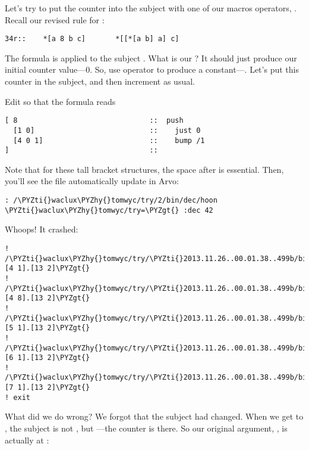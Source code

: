 Let's try to put the counter into the subject with one of our
macros operators, .  Recall our revised rule for :

\begin{framed_shaded}
\begin{Verbatim}[fontsize=\relsize{-2.5},fontseries=b,commandchars=\\\{\}]
34r::    *[a 8 b c]       *[[*[a b] a] c]
\end{Verbatim}
\end{framed_shaded}
The formula  is applied to the subject \kode{[*[a b] a]}.  What is
our ?  It should just produce our initial counter value---0.
So, use operator  to produce a constant---\kode{[1 0]}.  Let's
put this counter in the subject, and then increment as usual.

Edit  so that the formula reads

\begin{framed_shaded}
\begin{Verbatim}[fontsize=\relsize{-2.5},fontseries=b,commandchars=\\\{\}]
[ 8                               ::  push
  [1 0]                           ::    just 0
  [4 0 1]                         ::    bump /1
]                                 ::
\end{Verbatim}
\end{framed_shaded}
Note that for these tall bracket structures, the space after \kode{[}
is essential.  Then, you'll see the file automatically update in
Arvo:

\begin{framed_shaded}
\begin{Verbatim}[fontsize=\relsize{-2.5},fontseries=b,commandchars=\\\{\}]
: /\PYZti{}waclux\PYZhy{}tomwyc/try/2/bin/dec/hoon
\PYZti{}waclux\PYZhy{}tomwyc/try=\PYZgt{} :dec 42
\end{Verbatim}
\end{framed_shaded}
Whoops!  It crashed:

\begin{framed_shaded}
\begin{Verbatim}[fontsize=\relsize{-2.5},fontseries=b,commandchars=\\\{\}]
! /\PYZti{}waclux\PYZhy{}tomwyc/try/\PYZti{}2013.11.26..00.01.38..499b/bin/dec/:\PYZlt{}[4 1].[13 2]\PYZgt{}
! /\PYZti{}waclux\PYZhy{}tomwyc/try/\PYZti{}2013.11.26..00.01.38..499b/bin/dec/:\PYZlt{}[4 8].[13 2]\PYZgt{}
! /\PYZti{}waclux\PYZhy{}tomwyc/try/\PYZti{}2013.11.26..00.01.38..499b/bin/dec/:\PYZlt{}[5 1].[13 2]\PYZgt{}
! /\PYZti{}waclux\PYZhy{}tomwyc/try/\PYZti{}2013.11.26..00.01.38..499b/bin/dec/:\PYZlt{}[6 1].[13 2]\PYZgt{}
! /\PYZti{}waclux\PYZhy{}tomwyc/try/\PYZti{}2013.11.26..00.01.38..499b/bin/dec/:\PYZlt{}[7 1].[13 2]\PYZgt{}
! exit
\end{Verbatim}
\end{framed_shaded}
What did we do wrong?  We forgot that the subject had changed.
When we get to \kode{[4 0 1]}, the subject is not , but \kode{[0 42]}---the counter is there.  So our original argument, , is
actually at :

